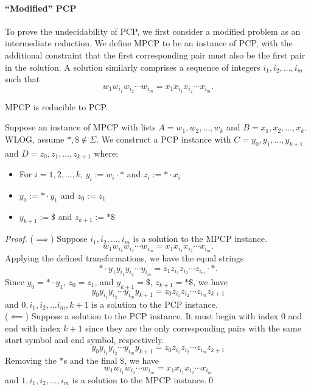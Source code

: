 \paragraph{``Modified'' PCP} To prove the undecidability of PCP, we first
consider a modified problem as an intermediate reduction. We define MPCP to be
an instance of PCP, with the additional constraint that the first corresponding
pair must also be the first pair in the solution. A solution similarly
comprises a sequence of integers $i_1,i_2,\ldots,i_m$ such that
\[w_1w_{i_1}w_{i_2}\cdots w_{i_m}=x_1x_{i_1}x_{i_2}\cdots x_{i_m}.\]

\begin{prop}
  MPCP is reducible to PCP.
\end{prop}
Suppose an instance of MPCP with lists $A=w_1,w_2,\ldots,w_k$ and
$B=x_1,x_2,\ldots,x_k$. WLOG, assume $*,\$\not\in\Sigma$. We construct a PCP
instance with $C=y_0,y_1,\ldots,y_{k+1}$ and $D=z_0,z_1,\ldots,z_{k+1}$ where:
\begin{itemize}
  \item For $i=1,2,\ldots,k$, $y_i:=w_i\cdot *$ and $z_i:=*\cdot x_i$
  \item $y_0:= *\cdot y_1$ and $z_0:=z_1$
  \item $y_{k+1}:=\$$ and $z_{k+1}:=*\$$
\end{itemize}
\begin{proof}
  ($\implies$) Suppose $i_1,i_2,\ldots,i_m$ is a solution to the MPCP instance.
  \[w_1w_{i_1}w_{i_2}\cdots w_{i_m}=x_1x_{i_1}x_{i_2}\cdots x_{i_m}.\]
  Applying the defined transformations, we have the equal strings
  \[*\cdot y_1y_{i_1}y_{i_2}\cdots y_{i_m}=z_1z_{i_1}z_{i_2}\cdots z_{i_m}\cdot *.\]
  Since $y_0=*\cdot y_1$, $z_0=z_1$, and $y_{k+1}=\$$, $z_{k+1}=*\$$, we have
  \[y_0y_{i_1}y_{i_2}\cdots y_{i_m}y_{k+1}=z_0z_{i_1}z_{i_2}\cdots z_{i_m} z_{k+1}\]
  and $0,i_1,i_2,\ldots i_m,k+1$ is a solution to the PCP instance.\\

  ($\impliedby$) Suppose a solution to the PCP instance. It must begin with
  index $0$ and end with index $k+1$ since they are the only corresponding
  pairs with the same start symbol and end symbol, respectively.
  \[y_0y_{i_1}y_{i_2}\cdots y_{i_m}y_{k+1}=z_0z_{i_1}z_{i_2}\cdots z_{i_m} z_{k+1}\]
  Removing the $*$s and the final $\$$, we have
  \[w_1w_{i_1}w_{i_2}\cdots w_{i_m}=x_1x_{i_1}x_{i_2}\cdots x_{i_m}\]
  and $1,i_1,i_2,\ldots,i_m$ is a solution to the MPCP instance.\qed
\end{proof}

